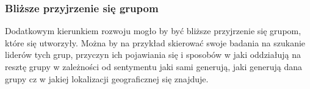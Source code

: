 \subsubsection{Bliższe przyjrzenie się grupom}
Dodatkowym kierunkiem rozwoju mogło by być bliższe przyjrzenie się grupom,
które się utworzyły. Można by na przykład skierować swoje badania
na szukanie liderów tych grup, przyczyn ich pojawiania się i sposobów w jaki
oddziałują na resztę grupy w zależności od sentymentu jaki sami generują,
jaki generują dana grupy cz w jakiej lokalizacji geograficznej się znajduje. 




